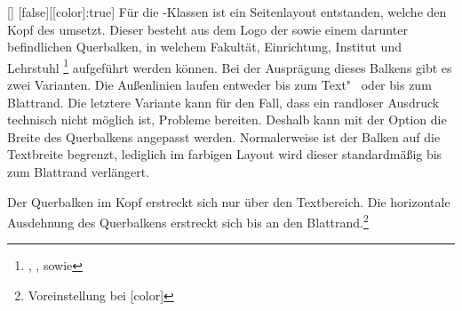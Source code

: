 \documentclass[%
  english,ngerman,%
  headings=optiontoheadandtoc,captions=tableheading,numbers=noenddot,%
  chapterpage,cdfoot,%
]{tudscrman}
\begin{document}
\begin{Declaration}{[\PBoolean]}%
  [false][[color]:true]%
\printdeclarationlist%
%
%
Für die \TUDScript-Klassen ist ein Seitenlayout entstanden, welche den Kopf des
\CDs umsetzt. Dieser besteht aus dem Logo der \TnUD sowie einem darunter 
befindlichen Querbalken, in welchem Fakultät, Einrichtung, Institut und 
Lehrstuhl%
\footnote{%
  , ,  sowie %
}
aufgeführt werden können. Bei der Ausprägung dieses Balkens gibt es zwei 
Varianten. Die Außenlinien laufen entweder bis zum Text"~ oder bis zum 
Blattrand. Die letztere Variante kann für den Fall, dass ein randloser Ausdruck 
technisch nicht möglich ist, Probleme bereiten. Deshalb kann mit der Option 
 die Breite des Querbalkens angepasst werden. Normalerweise 
ist der Balken auf die Textbreite begrenzt, lediglich im farbigen Layout wird 
dieser standardmäßig bis zum Blattrand verlängert.
%
\begin{values}
\itemfalse
  Der Querbalken im Kopf erstreckt sich nur über den Textbereich.
\itemtrue*
  Die horizontale Ausdehnung des Querbalkens erstreckt sich bis an den 
  Blattrand.\footnote{Voreinstellung bei [color]} 
\end{values}
\end{Declaration}
\end{document}
